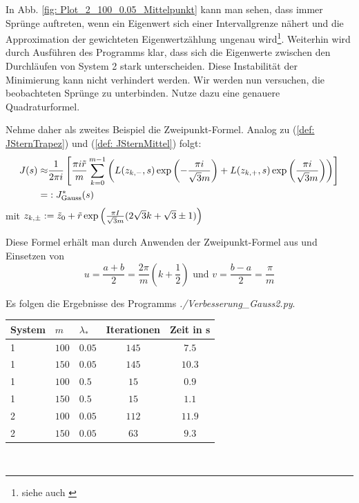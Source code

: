 \documentclass[a4paper,12pt]{report}
\newcommand{\zitat}[1]{\glqq #1\grqq}
\newcommand{\klammer}[1]{\left(#1\right)}
\newcommand{\1}{\mathds{1}}
\theoremstyle{plain} %
\theoremstyle{definition} %
\theoremstyle{remark}
\begin{document}
            In Abb. \ref{fig: Plot_2_100_0.05_Mittelpunkt} kann man sehen, dass immer Sprünge auftreten, wenn ein Eigenwert sich einer Intervallgrenze nähert und die Approximation der gewichteten Eigenwertzählung ungenau wird\footnote{siehe auch \cite[\textit{./Verbesserung\_Mittelpunkt.py}]{github}}.
            Weiterhin wird durch Ausführen des Programms klar, dass sich die Eigenwerte zwischen den Durchläufen von System 2 stark unterscheiden.
            Diese Instabilität der Minimierung kann nicht verhindert werden.
            Wir werden nun versuchen, die beobachteten Sprünge zu unterbinden. Nutze dazu eine genauere Quadraturformel.

            Nehme daher als zweites Beispiel die \zitat{Zweipunkt-Formel}\cite[S. 526]{numerikHermann}. Analog zu (\ref{def: JSternTrapez}) und (\ref{def: JSternMittel}) folgt:
            \begin{align}
                  J(s) \approx& \frac 1 {2\pi i}\left[\frac{\pi i \Tilde r}{m}\sum_{k=0}^{m-1}\klammer{L(z_{k,-}, s)\exp\klammer{-\frac{\pi i}{\sqrt{3}m}}+L(z_{k,+}, s)\exp\klammer{\frac{\pi i}{\sqrt{3}m}}}\right]\nonumber\\
                  =&: J^*_{\text{Gauss}}(s)
            \end{align}
            mit $z_{k,\pm}:=\Tilde z_0+\Tilde r\exp\klammer{\frac{\pi I}{\sqrt{3}m}(2\sqrt 3 k+\sqrt 3 \pm 1)}$

            Diese Formel erhält man durch Anwenden der Zweipunkt-Formel aus \cite[S. 526]{numerikHermann} und Einsetzen von
            $$u= \frac{a+b}{2} = \frac{2\pi}{m}(k+\frac 1 2)\text{ und }v=\frac{b-a}{2}=\frac \pi m$$

            Es folgen die Ergebnisse des Programms \textit{./Verbesserung\_Gauss2.py}.

            \begin{table}[!ht]
                  \centering
                  \begin{tabular}{lllcc}
                       System & $m$ & $\lambda_*$ & Iterationen & Zeit in s\\
                       \hline
                       1 & $100$ & $0.05$ & $145$ & $7.5$ \\ 
                       1 & $150$ & $0.05$ & $145$ & $10.3$ \\
                       \hline
                       1 & $100$ & $0.5$ & $15$ & $0.9$ \\
                       1 & $150$ & $0.5$ & $15$ & $1.1$ \\
                       \hline
                       2 & $100$ & $0.05$ & $112$ & $11.9$ \\
                       2 & $150$ & $0.05$ & $63$ & $9.3$ \\
                       \hline
                  \end{tabular}\\
                  \label{tab: Ergebnisse_Gauss2}
            \end{table}
\end{document}
